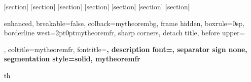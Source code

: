 

\usepackage{amsmath,amsfonts,amsthm,amssymb,mathtools}

\usepackage{enumitem}
\usepackage[most,many,breakable]{tcolorbox}
\usepackage{xcolor}
\usepackage{pgfplots}
\pgfplotsset{compat=1.17}
\usetikzlibrary{matrix, calc, positioning, arrows.meta, shapes.geometric, bbox}

\usepackage{hypcap}
\usepackage{algorithm, algpseudocode}

\usepackage{tabularx}

\renewcommand{\subsubsection}[1]{%
  \vspace{0.5em}
  \textbf{\large #1}\mbox{}\\
  \vspace{0.5em}}






[section]
[section]
[section]
[section]
[section]
[section]
[section]

{enhanced, breakable=false, colback=mytheorembg, frame hidden, boxrule=0sp, 
 borderline west={2pt}{0pt}{mytheoremfr}, sharp corners, detach title, 
 before upper={\renewcommand{\familydefault}{\sfdefault}\selectfont\tcbtitle\par\smallskip}, 
 coltitle=mytheoremfr, fonttitle=\bfseries\sffamily, description font=\mdseries, 
 separator sign none, segmentation style={solid, mytheoremfr}}{th}

